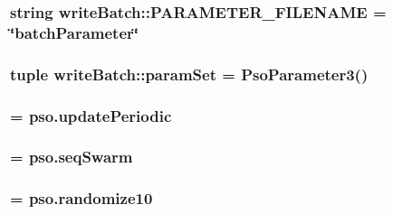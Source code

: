 \hypertarget{namespacewriteBatch_003da176dfacfb835c1e9133cdb37f8e}{
\subsubsection{\setlength{\rightskip}{0pt plus 5cm}string {\bf writeBatch::PARAMETER\_\-FILENAME} = \char`\"{}batchParameter\char`\"{}}}
\label{namespacewriteBatch_003da176dfacfb835c1e9133cdb37f8e}


\hypertarget{namespacewriteBatch_07e3eaa2887f04bd6d635e9e76aade01}{
\subsubsection{\setlength{\rightskip}{0pt plus 5cm}tuple {\bf writeBatch::paramSet} = {\bf PsoParameter3}()}}
\label{namespacewriteBatch_07e3eaa2887f04bd6d635e9e76aade01}


\hypertarget{namespacewriteBatch_e0121164fd219dbdfca08e9cf8144e45}{
\subsubsection{ = {\bf pso.updatePeriodic}}}
\label{namespacewriteBatch_e0121164fd219dbdfca08e9cf8144e45}


\hypertarget{namespacewriteBatch_09a690c62b5c4410937815d42e903ac1}{
\subsubsection{ = {\bf pso.seqSwarm}}}
\label{namespacewriteBatch_09a690c62b5c4410937815d42e903ac1}


\hypertarget{namespacewriteBatch_6d1164c3e9c081091446db6aa963ddf7}{
\subsubsection{ = {\bf pso.randomize10}}}
\label{namespacewriteBatch_6d1164c3e9c081091446db6aa963ddf7}


